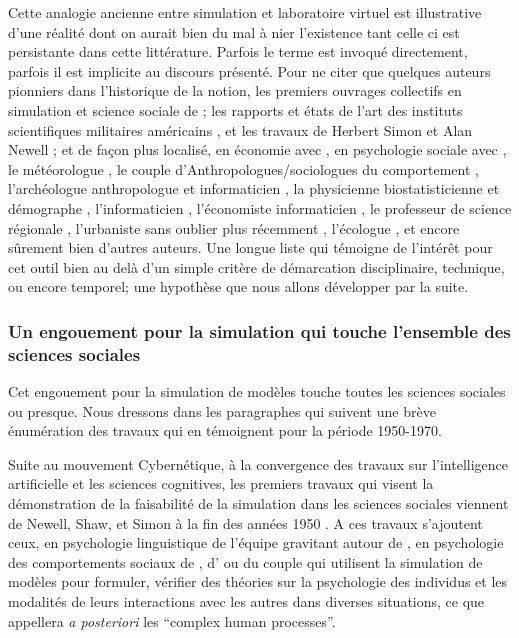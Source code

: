 Cette analogie ancienne entre simulation et laboratoire virtuel est illustrative d'une réalité dont on aurait bien du mal à nier l'existence tant celle ci est persistante dans cette littérature. Parfois le terme est invoqué directement, parfois il est implicite au discours présenté. Pour ne citer que quelques auteurs pionniers dans l'historique de la notion, les premiers ouvrages collectifs en simulation et science sociale de \textcite{Borko1962, Guetzkow1962, Guetzkow1972}; les rapports et états de l'art des instituts scientifiques militaires américains \autocite{Harman1961}, et les travaux de Herbert Simon et Alan Newell \autocite{Newell1961}; et de façon plus localisé, en économie avec \textcite[915]{Shubik1960b}, en psychologie sociale avec \textcite{Abelson1968}, le météorologue \textcite{Fleisher1965}, le couple d'Anthropologues/sociologues du comportement \textcite{Gullahorn1965}, l'archéologue anthropologue et informaticien \textcite{Doran1970}, la physicienne biostatisticienne et démographe \textcite{Sheps1971}, l'informaticien \textcite[3-4]{Forrester1971}, l'économiste informaticien \textcite{Naylor1966}, le professeur de science régionale \textcite[271]{Harris1966}, l'urbaniste \textcite[295]{Batty1976} sans oublier plus récemment \textcite{Epstein1996}, l'écologue \textcite{Grimm2006}, et encore sûrement bien d'autres auteurs. Une longue liste qui témoigne de l'intérêt pour cet outil bien au delà d'un simple critère de démarcation disciplinaire, technique, ou encore temporel; une hypothèse que nous allons développer par la suite.

\subsubsection{Un engouement pour la simulation qui touche l'ensemble des sciences sociales}
\label{ssec:engouement_sciencesociale}

Cet engouement pour la simulation de modèles touche toutes les sciences sociales ou presque. Nous dressons dans les paragraphes qui suivent une brève énumération des travaux qui en témoignent pour la période 1950-1970.

Suite au mouvement Cybernétique, à la convergence des travaux sur l'intelligence artificielle et les sciences cognitives, les premiers travaux qui visent la démonstration de la faisabilité de la simulation dans les sciences sociales viennent de Newell, Shaw, et Simon à la fin des années 1950 \autocite{Gullahorn1965}. A ces travaux s'ajoutent ceux, en psychologie linguistique de l'équipe gravitant autour de \textcite[280-416]{Borko1962}, en psychologie des comportements sociaux de \textcite{Hovland1960}, d'\textcites{Abelson1961, Abelson1968} ou du couple \textcite{Gullahorn1965a} qui utilisent la simulation de modèles pour formuler, vérifier des théories sur la psychologie des individus et les modalités de leurs interactions avec les autres dans diverses situations, ce que \textcite{Ostrom1988} appellera \textit{a posteriori} les \foreignquote{english}{complex human processes}.

